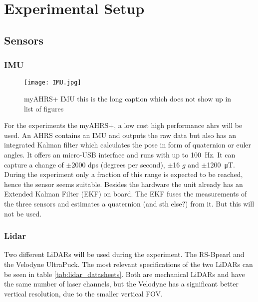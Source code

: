 \chapter{Experimental Setup}
\label{ch:ExperimentalSetup}

\section{Sensors}
\subsection{IMU}
\begin{figure}[htb]
	\centering
	\texttt{[image: IMU.jpg]}
	\caption[myAHRS+ IMU]{myAHRS+ IMU this is the long caption which does not show up in list of figures }
	\label{fig:imu}
\end{figure}

For the experiments the myAHRS+, a low cost high performance \gls{ahrs} will be used.
An AHRS contains an IMU and outputs the raw data but also has an integrated Kalman filter which calculates the pose in form of quaternion or euler angles.
It offers an micro-USB interface and runs with up to \SI{100}{\Hz}.
It can capture a change of $\pm$2000 dps (degrees per second), $\pm$16 $g$ and $\pm$\SI{1200}{\micro\tesla}.
During the experiment only a fraction of this range is expected to be reached, hence the sensor seems suitable.
Besides the hardware the unit already has an Extended Kalman Filter (EKF) on board.
The EKF fuses the measurements of the three sensors and estimates a quaternion (and sth else?) from it.
But this will not be used.

\subsection{Lidar}
Two different LiDARs will be used during the experiment.
The RS-Bpearl and the Velodyne UltraPuck.
The most relevant specifications of the two LiDARs can be seen in table \ref{tab:lidar_datasheets}.
Both are mechanical LiDARs and have the same number of laser channels, but the Velodyne has a significant better vertical resolution, due to the smaller vertical FOV.


